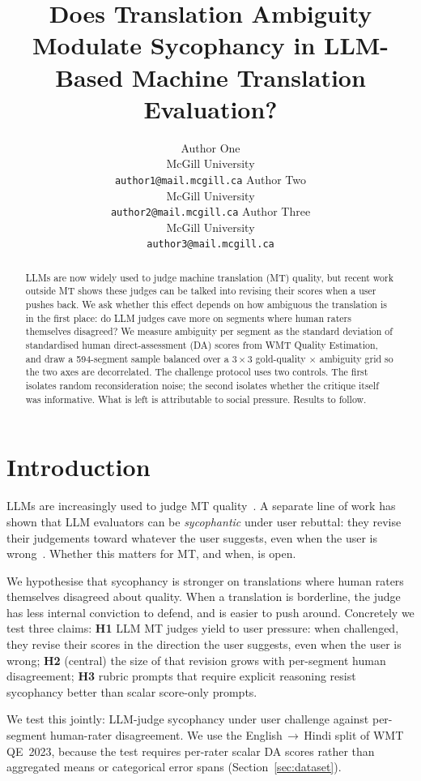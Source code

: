 \documentclass[11pt]{article}
\title{Does Translation Ambiguity Modulate Sycophancy in
       LLM-Based Machine Translation Evaluation?}
\author{Author One \\ McGill University \\ \texttt{author1@mail.mcgill.ca}
        \And
        Author Two \\ McGill University \\ \texttt{author2@mail.mcgill.ca}
        \And
        Author Three \\ McGill University \\ \texttt{author3@mail.mcgill.ca}}
\begin{document}
\maketitle

\begin{abstract}
LLMs are now widely used to judge machine translation (MT) quality, but
recent work outside MT shows these judges can be talked into revising their
scores when a user pushes back. We ask whether this effect depends on how
ambiguous the translation is in the first place: do LLM judges cave more on
segments where human raters themselves disagreed? We measure ambiguity per
segment as the standard deviation of standardised human direct-assessment
(DA) scores from WMT Quality Estimation, and draw a 594-segment sample
balanced over a $3 \times 3$ gold-quality $\times$ ambiguity grid so the two
axes are decorrelated. The challenge protocol uses two controls. The first
isolates random reconsideration noise; the second isolates whether the
critique itself was informative. What is left is attributable to social
pressure. Results to follow.
\end{abstract}

\section{Introduction}

LLMs are increasingly used to judge MT
quality~\cite{kocmi-federmann-2023-gemba,wmt2025metrics}. A separate line
of work has shown that LLM evaluators can be \emph{sycophantic} under user
rebuttal: they revise their judgements toward whatever the user suggests,
even when the user is
wrong~\cite{sharma-sycophancy-2023,kim-khashabi-2025,hwang-grader-2025}.
Whether this matters for MT, and when, is open.

We hypothesise that sycophancy is stronger on translations where human
raters themselves disagreed about quality. When a translation is
borderline, the judge has less internal conviction to defend, and is
easier to push around. Concretely we test three claims:
\textbf{H1} LLM MT judges yield to user pressure: when challenged, they
revise their scores in the direction the user suggests, even when the
user is wrong;
\textbf{H2} (central) the size of that revision grows with per-segment
human disagreement;
\textbf{H3} rubric prompts that require explicit reasoning resist
sycophancy better than scalar score-only prompts.

We test this jointly: LLM-judge sycophancy under user challenge against
per-segment human-rater disagreement. We use the English\,$\to$\,Hindi
split of WMT QE~2023, because the test requires per-rater scalar DA
scores rather than aggregated means or categorical error spans
(Section~\ref{sec:dataset}).
\end{document}
